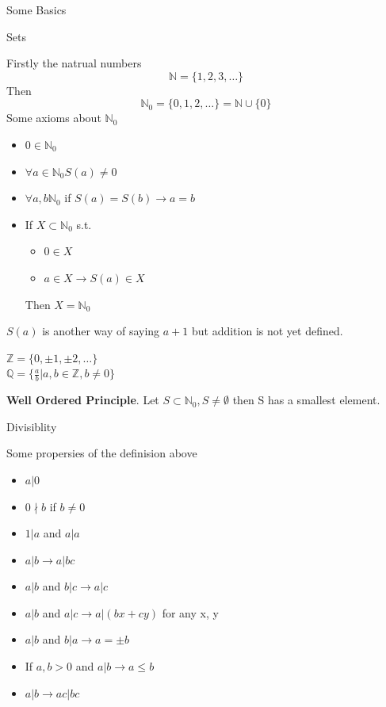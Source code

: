 \documentclass[12pt, letterpaper]{article}
\begin{document}
\begin{section}{Some Basics}

  \begin{subsection}{Sets}

    Firstly the natrual numbers \[\mathbb{N} = \{ 1, 2, 3, \dots \}\]
    Then \[\mathbb{N}_{0} = \{ 0, 1, 2, \dots \} = \mathbb{N} \cup \{ 0 \}\]
    Some axioms about \(\mathbb{N}_{0}\)
    \begin{itemize}
      \item \(0 \in \mathbb{N}_{0}\)
      \item \(\forall a \in \mathbb{N}_{0} S(a) \neq 0\)
      \item \(\forall a, b \mathbb{N}_{0}\) if \(S(a) = S(b) \to a = b\)
      \item If \(X \subset \mathbb{N}_{0}\) s.t.
            \begin{itemize}
              \item \(0 \in X\)
              \item \(a \in X \to S(a) \in X\)
            \end{itemize}
            Then \(X = \mathbb{N}_{0}\)
    \end{itemize}

    \(S(a)\) is another way of saying \(a + 1\) but addition is not yet defined.

    \(\mathbb{Z} = \{ 0, \pm 1, \pm 2, \dots \}\) \\
    \(\mathbb{Q} = \{ \frac{a}{b} | a, b \in \mathbb{Z}, b \neq 0 \}\)

    \textbf{Well Ordered Principle}. Let \(S \subset \mathbb{N}_{0}, S \neq \emptyset\)
    then S has a smallest element.

  \end{subsection}

  \begin{subsection}{Divisiblity}

    Some propersies of the definision above
    \begin{itemize}
      \item \(a | 0\)
      \item \(0 \nmid b\) if \(b \neq 0\)
      \item \(1 | a\) and \(a | a\)
      \item \(a | b \to a | bc\)
      \item \(a | b\) and \(b | c \to a | c\)
      \item \(a | b\) and \(a | c \to a | (bx + cy)\) for any x, y
      \item \(a | b\) and \(b | a \to a = \pm b\)
      \item If \(a, b > 0\) and \(a | b \to a \leq b\)
      \item \(a | b \to ac | bc\)
    \end{itemize}


\end{subsection}
\end{section}
\end{document}
